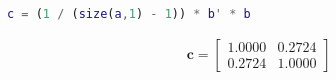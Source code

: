 \begin{solution}
    \begin{lstlisting}[language=Matlab]
c = (1 / (size(a,1) - 1)) * b' * b
    \end{lstlisting}
    
    \begin{align*}
        \boldsymbol{c} = \begin{bmatrix}
            1.0000 & 0.2724 \\
            0.2724 & 1.0000
        \end{bmatrix}
    \end{align*}
\end{solution}